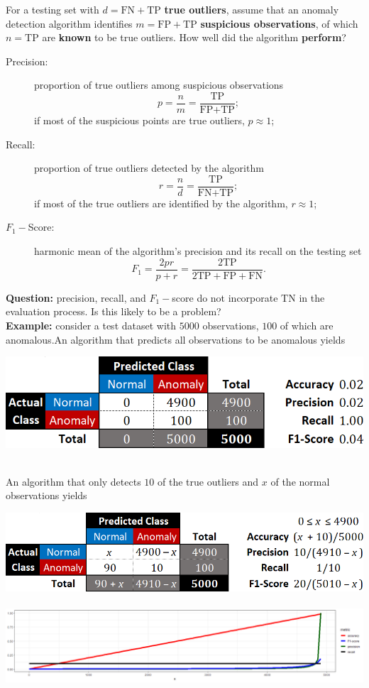 \documentclass[20pt,landscape,footrule,headrule]{foils}
\newcommand{\newl}{\newline\newline}
\begin{document}
For a testing set with $d=\text{FN}+\text{TP}$ \textbf{true outliers}, assume that an anomaly detection algorithm identifies $m=\text{FP}+\text{TP}$ \textbf{suspicious observations}, of which $n=\text{TP}$ are \textbf{known} to be true outliers. \newl How well did the algorithm \textbf{perform}?   
\begin{description}
\item[Precision:] proportion of true outliers among suspicious observations $$p=\frac{n}{m}=\frac{\text{TP}}{\text{FP}+\text{TP}};$$ if most of the suspicious points are true outliers, $p\approx 1$;
\newpage\ \item[Recall:] proportion of true outliers detected by the algorithm
$$r=\frac{n}{d}=\frac{\text{TP}}{\text{FN}+\text{TP}};$$ if most of the true outliers are identified by the algorithm, $r\approx 1$;
\item[$F_1-$Score:] harmonic mean of the algorithm's precision and its recall on the testing set 
$$F_1=\frac{2pr}{p+r}=\frac{2\text{TP}}{2\text{TP}+\text{FP}+\text{FN}}.$$
\end{description}
\textbf{Question:} precision, recall, and $F_1-$score do not incorporate $\text{TN}$ in the evaluation process. Is this likely to be a problem? 
\newpage\ \\ \noindent \textbf{Example:} consider a test dataset with $5000$ observations, $100$ of which are anomalous.\newl An algorithm that predicts all observations to be anomalous yields 
\begin{center}
\includegraphics[width=\textwidth]{Images/Ex1.png}
\end{center}
\newpage\ \\ \noindent An algorithm that only detects $10$ of the true outliers and $x$ of the normal observations yields
\begin{center}
\includegraphics[width=\textwidth]{Images/Ex2.png}\\ \ \\ 
\includegraphics[width=\textwidth]{Images/AODA_metrics.png}
\end{center}
\end{document}
